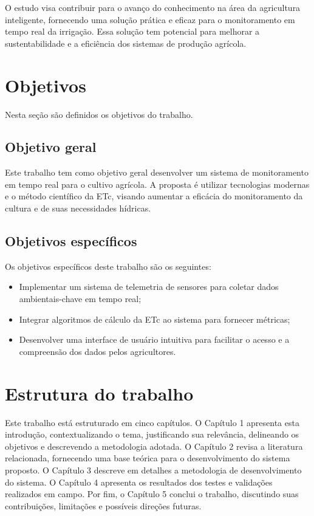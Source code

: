 O estudo visa contribuir para o avanço do conhecimento na área da agricultura inteligente, fornecendo uma solução prática e eficaz para o monitoramento em tempo real da irrigação. Essa solução tem potencial para melhorar a sustentabilidade e a eficiência dos sistemas de produção agrícola.

\section{Objetivos}

Nesta seção são definidos os objetivos do trabalho.

\subsection{Objetivo geral}

Este trabalho tem como objetivo geral desenvolver um sistema de monitoramento em tempo real para o cultivo agrícola. A proposta é utilizar tecnologias modernas e o método científico da ETc, visando aumentar a eficácia do monitoramento da cultura e de suas necessidades hídricas.

\subsection{Objetivos específicos}

Os objetivos específicos deste trabalho são os seguintes:

\begin{itemize}
    \item Implementar um sistema de telemetria de sensores para coletar dados ambientais-chave em tempo real;
    \item Integrar algoritmos de cálculo da ETc ao sistema para fornecer métricas;
    \item Desenvolver uma interface de usuário intuitiva para facilitar o acesso e a compreensão dos dados pelos agricultores.
\end{itemize}

\section{Estrutura do trabalho}
Este trabalho está estruturado em cinco capítulos. O Capítulo 1 apresenta esta introdução, contextualizando o tema, justificando sua relevância, delineando os objetivos e descrevendo a metodologia adotada. O Capítulo 2 revisa a literatura relacionada, fornecendo uma base teórica para o desenvolvimento do sistema proposto. O Capítulo 3 descreve em detalhes a metodologia de desenvolvimento do sistema. O Capítulo 4 apresenta os resultados dos testes e validações realizados em campo. Por fim, o Capítulo 5 conclui o trabalho, discutindo suas contribuições, limitações e possíveis direções futuras.